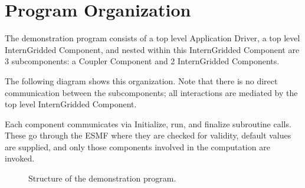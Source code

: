 
\section{Program Organization}

The demonstration program consists of a top level Application
Driver, a top level InternGridded Component, and nested within this InternGridded
Component are 3 subcomponents: a Coupler Component and 2 InternGridded Components.

The following diagram shows this organization.  Note that there
is no direct communication between the subcomponents; all
interactions are mediated by the top level InternGridded Component.

Each component communicates via Initialize, run, and finalize
subroutine calls.  These go through the ESMF where
they are checked for validity, default values are supplied,
and only those components involved in the computation are
invoked.


\begin{figure}[bpht]
\caption[Components]{Structure of the demonstration program.}
\label{fig:democomps}
\begin{center}
\end{center}
\end{figure}


